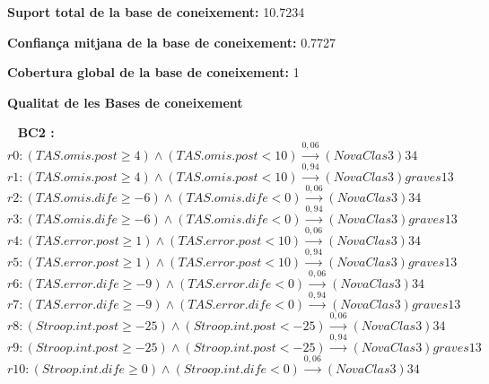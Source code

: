 {\bf Suport total de la base de coneixement:} 10.7234

{\bf Confian\c ca mitjana de la base de coneixement:} 0.7727

{\bf Cobertura global de la base de coneixement:} 1
\newpage
\mbox{ } \vfill
\begin{center} \Large \bf Qualitat de les Bases de coneixement \end{center} \vfill

\newpage
\mbox{ }
{\Large \bf BC2 :}\\

$r0: (TAS.omis.post \geq 4) \wedge (TAS.omis.post < 10)\stackrel{0,06}{\longrightarrow} (NovaClas3)34$\\

$r1: (TAS.omis.post \geq 4) \wedge (TAS.omis.post < 10)\stackrel{0,94}{\longrightarrow} (NovaClas3)graves13$\\

$r2: (TAS.omis.dife \geq -6) \wedge (TAS.omis.dife < 0)\stackrel{0,06}{\longrightarrow} (NovaClas3)34$\\

$r3: (TAS.omis.dife \geq -6) \wedge (TAS.omis.dife < 0)\stackrel{0,94}{\longrightarrow} (NovaClas3)graves13$\\

$r4: (TAS.error.post \geq 1) \wedge (TAS.error.post < 10)\stackrel{0,06}{\longrightarrow} (NovaClas3)34$\\

$r5: (TAS.error.post \geq 1) \wedge (TAS.error.post < 10)\stackrel{0,94}{\longrightarrow} (NovaClas3)graves13$\\

$r6: (TAS.error.dife \geq -9) \wedge (TAS.error.dife < 0)\stackrel{0,06}{\longrightarrow} (NovaClas3)34$\\

$r7: (TAS.error.dife \geq -9) \wedge (TAS.error.dife < 0)\stackrel{0,94}{\longrightarrow} (NovaClas3)graves13$\\

$r8: (Stroop.int.post \geq -25) \wedge (Stroop.int.post < -25)\stackrel{0,06}{\longrightarrow} (NovaClas3)34$\\

$r9: (Stroop.int.post \geq -25) \wedge (Stroop.int.post < -25)\stackrel{0,94}{\longrightarrow} (NovaClas3)graves13$\\

$r10: (Stroop.int.dife \geq 0) \wedge (Stroop.int.dife < 0)\stackrel{0,06}{\longrightarrow} (NovaClas3)34$\\

